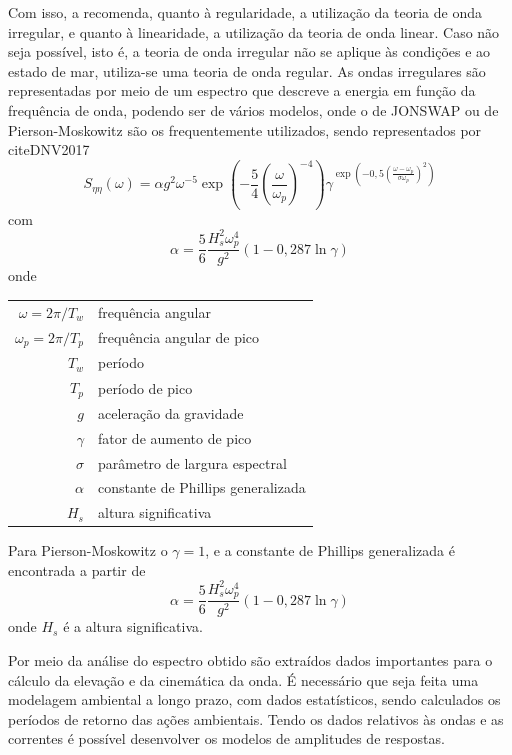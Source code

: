Com isso, a  recomenda, quanto à regularidade, a utilização da teoria de onda irregular, e quanto à linearidade, a utilização da teoria de onda linear.
Caso não seja possível, isto é, a teoria de onda irregular não se aplique às condições e ao estado de mar, utiliza-se uma teoria de onda regular.
As ondas irregulares são representadas por meio de um espectro que descreve a energia em função da frequência de onda, podendo ser de vários modelos, onde o de JONSWAP ou de Pierson-Moskowitz são os frequentemente utilizados, sendo representados por cite{DNV2017}
\begin{equation}
\label{eq:viv-eq2}
S_{\eta\eta}(\omega) = \alpha g^2 \omega^{-5} \exp\left(-\frac{5}{4}\left(\frac{\omega}{\omega_p}\right)^{-4}\right)\gamma^{\exp \left(-0,5\left(\frac{\omega-\omega_p}{\sigma \omega_p}\right)^2\right)}
\end{equation}
com
\begin{equation}
\label{eq:viv-eq3}
\alpha = \frac{5}{6} \frac{H_s^2 \omega_p^4}{g^2} \left(1- 0,287 \ln{\gamma}\right)
\end{equation}
onde

\begin{tabular}{rl}
	$\omega = 2\pi/T_w$   & frequência angular\\
	$\omega_p = 2\pi/T_p$ & frequência angular de pico\\
	$T_w$                 & período\\
	$T_p$                 & período de pico\\
	$g$                   & aceleração da gravidade\\
	$\gamma$              & fator de aumento de pico\\
	$\sigma$              & parâmetro de largura espectral\\
	$\alpha$              & constante de Phillips generalizada\\
	$H_s$                 & altura significativa
\end{tabular}

Para Pierson-Moskowitz o $\gamma=1$, e a constante de Phillips generalizada é encontrada a partir de
\begin{equation}
\label{eq:viv-phillips}
\alpha = \frac{5}{6} \frac{H_s^2 \omega_p^4}{g^2} \left(1- 0,287 \ln{\gamma}\right)
\end{equation}
onde $H_s$ é a altura significativa.

Por meio da análise do espectro obtido são extraídos dados importantes para o cálculo da elevação e da cinemática da onda.
É necessário que seja feita uma modelagem ambiental a longo prazo, com dados estatísticos, sendo calculados os períodos de retorno das ações ambientais.
Tendo os dados relativos às ondas e as correntes é possível desenvolver os modelos de amplitudes de respostas.
